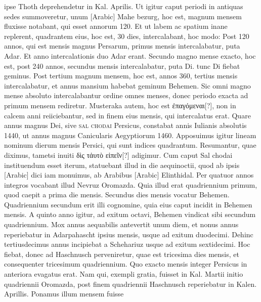 ipse Thoth deprehendetur in Kal. Aprilis.
Ut igitur caput periodi
in antiquas sedes summoveretur, unum \textarabic{}[Arabic] Mahe bezurg,
hoc est, magnum mensem fluxisse notabant, qui esset annorum
120. %
%
Et ut labem ac spatium inane replerent, quadrantem eius, hoc
est, 30 dies, intercalabant, hoc modo: Post 120 annos, qui est mensis
magnus Persarum, primus mensis intercalabatur, puta Adar.
Et
anno intercalationis duo Adar erant.
Secundo magno mense exacto,
hoc est, post 240 annos, secundus mensis intercalabatur, puta Di. %
 tunc
Di fiebat geminus.
Post tertium magnum mensem, hoc est, annos
360, tertius mensis intercalabatur, et annus  mansium habebat
geminum Behemen.
Sic omni magno mense absoluto intercalabantur
ordine omnes menses, donec periodo exacta ad primum
mensem rediretur.
Musteraka autem, hoc est \textgreek{ἐπαγόμεναι}[?], non in
calcem anni reiiciebantur, sed in finem eius mensis, qui intercalatus
erat.
Quare annus magnus Dei, sive \textsc{sal chodai} Persicus,
constabat annis Iulianis absolutis 1440, ut annus magnus Canicularis
Aegyptiorum 1460.
Apposuimus igitur lineam nominum dierum
mensis Persici, qui sunt indices quadrantum.
Resumantur, quae
diximus, tametsi inuiti %
 \textgreek{δὶς τἀυτὸ εἰπεῖν}[?] adigimur.
Cum caput Sal chodai
instituendum esset iterum, statuebant illud in die aequinoctii,
quod ab ipsis \textarabic{}[Arabic] dici iam monuimus, ab Arabibus
 \textarabic{}[Arabic]
Elinthidal.
Per quatuor annos integros vocabant illud Nevruz Oromazda.
Quia illud erat quadriennium primum, quod caepit a prima
die mensis.
Secundus dies mensis vocatur Behemen.
Quadriennium
secundum erit illi cognomine, quia eius caput incidit in Behemen
mensis.
A quinto anno igitur, ad exitum octavi, Behemen vindicat
sibi secundum quadriennium.
Mox annus aequabilis antevertit
unum diem, et nonus annus reperiebatur in Adarpahascht ipsius mensis,
usque %
 ad exitum duodecimi.
Dehinc tertiusdecimus annus incipiebat
a Schehariuz usque ad exitum sextidecimi.
Hoc fiebat, donec ad
Haschnusch perveniretur, quae est tricesima dies mensis, et consequenter
tricesimum quadriennium.
Quo exacto mensis integer Persicus
in anteriora evagatus erat.
Nam qui, exempli gratia, fuisset in Kal. %
Martii initio quadriennii Oromazda, post finem quadriennii Haschnusch
reperiebatur in Kalen. %
 Aprillis.
Ponamus illum mensem fuisse
